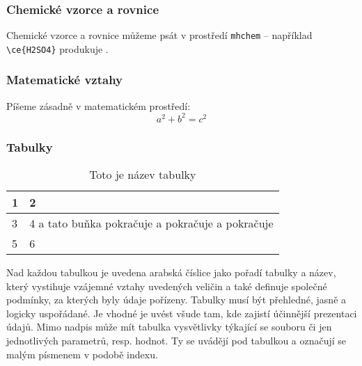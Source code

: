 \documentclass[a4paper, 12pt]{article}
\begin{document}
\subsubsection*{Chemické vzorce a rovnice}
Chemické vzorce a rovnice můžeme psát v prostředí \texttt{mhchem} -- například \texttt{\textbackslash{}ce\{H2SO4\}} produkuje .

\subsubsection*{Matematické vztahy}
Píšeme zásadně v matematickém prostředí:
$$ a^2 + b^2 = c^2 $$

\subsubsection*{Tabulky}
\begin{table}[h]
\caption{Toto je název tabulky}
\begin{center}
\begin{tabular}{|l|l|}
\hline
1 & 2\\
\hline
3 & 4 a tato buňka pokračuje a pokračuje a pokračuje \\
5 & 6 \\
\hline
\end{tabular}
\end{center}
\end{table}

Nad každou tabulkou je uvedena arabská číslice jako pořadí tabulky a název, který vystihuje vzájemné vztahy uvedených veličin a také definuje společné podmínky, za kterých byly údaje pořízeny. Tabulky musí být přehledné, jasně a logicky uspořádané. Je vhodné je uvést všude tam, kde zajistí účinnější prezentaci údajů. Mimo nadpis může mít tabulka vysvětlivky týkající se souboru či jen jednotlivých parametrů, resp. hodnot. Ty se uvádějí pod tabulkou a označují se malým písmenem v podobě indexu.
\end{document}
